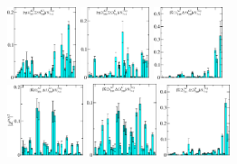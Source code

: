 \begin{figure}[H]
    \includegraphics[width=0.18\textwidth]{figures/sigmas/g2g/zfactors/zfactor_isotriplet_eta_sigma-G2g_1-P001-A2p-SS_1-P00-1-G2-SS_0.pdf}
    \includegraphics[width=0.18\textwidth]{figures/sigmas/g2g/zfactors/zfactor_isotriplet_eta_sigma-G2g_1-P011-A2p-SS_0-P0-1-1-G-SS_1.pdf}
    \includegraphics[width=0.18\textwidth]{figures/sigmas/g2g/zfactors/zfactor_isotriplet_kbar_delta-G2g_1-P001-A2-SS_0-P00-1-G2-SS_0.pdf}\\
    \includegraphics[width=0.1975\textwidth]{figures/sigmas/g2g/zfactors/zfactor_isotriplet_kbar_delta-G2g_1-P001-A2-SS_1-P00-1-G2-SS_0.pdf}
    \includegraphics[width=0.18\textwidth]{figures/sigmas/g2g/zfactors/zfactor_isotriplet_kbar_delta-G2g_1-P011-A2-SS_0-P0-1-1-G-SS_0.pdf}
    \includegraphics[width=0.18\textwidth]{figures/sigmas/g2g/zfactors/zfactor_isotriplet_kbar_delta-G2g_1-P011-A2-SS_1-P0-1-1-G-SS_0.pdf}

\end{figure}

